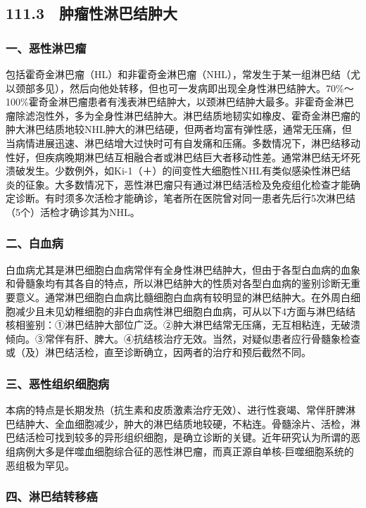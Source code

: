\subsection{111.3　肿瘤性淋巴结肿大}

\subsubsection{一、恶性淋巴瘤}

包括霍奇金淋巴瘤（HL）和非霍奇金淋巴瘤（NHL），常发生于某一组淋巴结（尤以颈部多见），然后向他处转移，但也可一发病即出现全身性淋巴结肿大。70\%～100\%霍奇金淋巴瘤患者有浅表淋巴结肿大，以颈淋巴结肿大最多。非霍奇金淋巴瘤除滤泡性外，多为全身性淋巴结肿大。淋巴结质地韧实如橡皮、霍奇金淋巴瘤的肿大淋巴结质地较NHL肿大的淋巴结硬，但两者均富有弹性感，通常无压痛，但当病情进展迅速、淋巴结增大过快时可有自发痛和压痛。多数情况下，淋巴结移动性好，但疾病晚期淋巴结互相融合者或淋巴结巨大者移动性差。通常淋巴结无坏死溃破发生。少数例外，如Ki-1（＋）的间变性大细胞性NHL有类似感染性淋巴结炎的征象。大多数情况下，恶性淋巴瘤只有通过淋巴结活检及免疫组化检查才能确定诊断。有时须多次活检才能确诊，笔者所在医院曾对同一患者先后行5次淋巴结（5个）活检才确诊其为NHL。

\subsubsection{二、白血病}

白血病尤其是淋巴细胞白血病常伴有全身性淋巴结肿大，但由于各型白血病的血象和骨髓象均有其各自的特点，所以淋巴结肿大的性质对各型白血病的鉴别诊断无重要意义。通常淋巴细胞白血病比髓细胞白血病有较明显的淋巴结肿大。在外周白细胞减少且未见幼稚细胞的非白血病性淋巴细胞白血病，可从以下4方面与淋巴结结核相鉴别：①淋巴结肿大部位广泛。②肿大淋巴结常无压痛，无互相粘连，无破溃倾向。③常伴有肝、脾大。④抗结核治疗无效。当然，对疑似患者应行骨髓象检查或（及）淋巴结活检，直至诊断确立，因两者的治疗和预后截然不同。

\subsubsection{三、恶性组织细胞病}

本病的特点是长期发热（抗生素和皮质激素治疗无效）、进行性衰竭、常伴肝脾淋巴结肿大、全血细胞减少，肿大的淋巴结质地较硬，不粘连。骨髓涂片、活检，淋巴结活检可找到较多的异形组织细胞，是确立诊断的关键。近年研究认为所谓的恶组病例大多是伴噬血细胞综合征的恶性淋巴瘤，而真正源自单核-巨噬细胞系统的恶组极为罕见。

\subsubsection{四、淋巴结转移癌}

